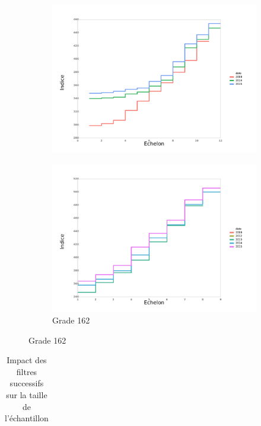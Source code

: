 \documentclass[11pt,a4paper]{article}
\begin{document}
\begin{figure}[ht]
\begin{subfigure}[b]{0.55\linewidth}
    \label{echelon_by_neg_2} 
    \centering
    \includegraphics[width=1\linewidth]{AA_14_grille_by_neg.pdf} 
  \end{subfigure}%
  \begin{subfigure}[b]{0.55\linewidth}
        \caption{Grade 162} 
    \label{echelon_by_neg_3} 
    \centering
    \includegraphics[width=1\linewidth]{AA_162_grille_by_neg.pdf} 
  \end{subfigure} 
\end{figure}



\begin{table}[h!]
\centering
\caption{Impact des filtres successifs sur la taille de l'échantillon} 
\label{filters_AT}
\begin{tabular}{lcc}
\toprule

\bottomrule
\end{tabular}
\end{table}
\end{document}
